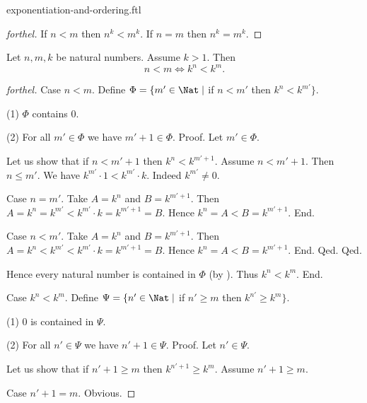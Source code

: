 \documentclass{naproche-library}
\begin{document}
\begin{smodule}{exponentiation-and-ordering.ftl}
\begin{proof}[forthel]
    If $n < m$ then $n^{k} < m^{k}$.
    If $n = m$ then $n^{k} = m^{k}$.
  \end{proof}

  \begin{proposition}[forthel,id=ARITHMETIC_09_3349764703780864]
    Let $n, m, k$ be natural numbers.
    Assume $k > 1$.
    Then \[ n < m \iff k^{n} < k^{m}. \]
  \end{proposition}
  \begin{proof}[forthel]
    Case $n < m$.
      Define $\Phi = \{ m' \in \Nat \mid$ if $n < m'$ then $k^{n} < k^{m'} \}$.

      (1) $\Phi$ contains $0$.

      (2) For all $m' \in \Phi$ we have $m' + 1 \in \Phi$. \newline
      Proof.
        Let $m' \in \Phi$.

        Let us show that if $n < m' + 1$ then $k^{n} < k^{m' + 1}$.
          Assume $n < m' + 1$.
          Then $n \leq m'$.
          We have $k^{m'} \cdot 1 < k^{m'} \cdot k$.
          Indeed $k^{m'} \neq 0$.

          Case $n = m'$.
            Take $A = k^{n}$ and $B = k^{m' + 1}$. %
            Then $A
              = k^{n}
              = k^{m'}
              < k^{m'} \cdot k
              = k^{m' + 1}
              = B$.
            Hence $k^{n} = A < B = k^{m' + 1}$.
          End.

          Case $n < m'$.
            Take $A = k^{n}$ and $B = k^{m' + 1}$. %
            Then $A
              = k^{n}
              < k^{m'}
              < k^{m'} \cdot k
              = k^{m' + 1}
              = B$.
            Hence $k^{n} = A < B = k^{m' + 1}$.
          End.
        Qed.
      Qed.

      Hence every natural number is contained in $\Phi$ (by ).
      Thus $k^{n} < k^{m}$.
    End.

    Case $k^{n} < k^{m}$.
      Define $\Psi = \{ n' \in \Nat \mid$ if $n' \geq m$ then
      $k^{n'} \geq k^{m} \}$.

      (1) $0$ is contained in $\Psi$.

      (2) For all $n' \in \Psi$ we have $n' + 1 \in \Psi$. \newline
      Proof.
        Let $n' \in \Psi$.

        Let us show that if $n' + 1 \geq m$ then $k^{n' + 1} \geq k^{m}$.
          Assume $n' + 1 \geq m$.

          Case $n' + 1 = m$. Obvious.


\end{proof}
\end{smodule}
\end{document}
